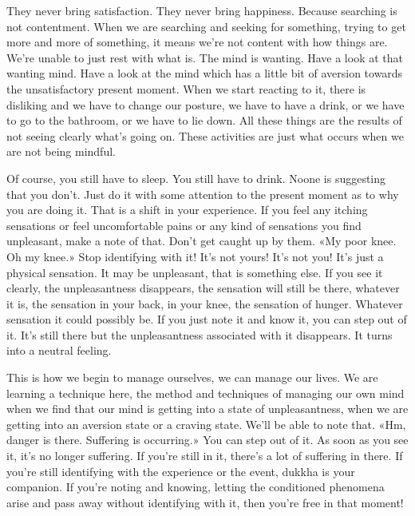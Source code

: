 \documentclass[letterpaper,10pt,english]{sphinxmanual}
\begin{document}
\sphinxAtStartPar
They  never  bring  satisfaction.  They  never  bring  happiness.  Because
searching is not contentment. When we are searching and seeking for something, trying to get more and more of something, it means we’re not content
with  how  things  are.  We’re  unable  to  just  rest  with  what  is.  The  mind  is
wanting. Have a look at that wanting mind. Have a look at the mind which
has a little bit of aversion towards the unsatisfactory present moment. When
we start reacting to it, there is disliking and we have to change our posture,
we have to have a drink, or we have to go to the bathroom, or we have to lie
down. All these things are the results of not seeing clearly what’s going on.
These activities are just what occurs when we are not being mindful.

\sphinxAtStartPar
Of course, you still have to sleep. You still have to drink. No\sphinxhyphen{}one is suggesting that you don’t. Just do it with some attention to the present moment
as to why you are doing it. That is a shift in your experience. If you feel any
  itching sensations or feel uncomfortable pains or any kind of sensations you
find unpleasant, make a note of that. Don’t get caught up by them. «My poor
knee. Oh my knee.» Stop identifying with it! It’s not yours! It’s not you! It’s
just a physical sensation. It may be unpleasant, that is something else. If you
see it clearly, the unpleasantness disappears, the sensation will still be there,
whatever  it  is,  the  sensation  in  your  back,  in  your  knee,  the  sensation  of
hunger. Whatever sensation it could possibly be. If you just note it and know
it, you can step out of it. It’s still there but the unpleasantness associated with
it disappears. It turns into a neutral feeling.

\sphinxAtStartPar
This is how we begin to manage ourselves, we can manage our lives.
We are learning a technique here, the method and techniques of managing
our own mind when we find that our mind is getting into a state of unpleasantness, when we are getting into an aversion state or a craving state. We’ll
be able to note that. «Hm, danger is there. Suffering is occurring.» You can
step out of it. As soon as you see it, it’s no longer suffering. If you’re still in
it, there’s a lot of suffering in there. If you’re still identifying with the experience or the event, dukkha is your companion. If you’re noting and knowing,
letting the conditioned phenomena arise and pass away without identifying
with it, then you’re free in that moment!
\end{document}
